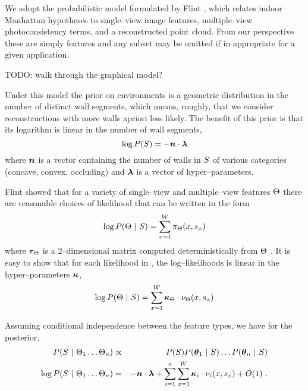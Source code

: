 We adopt the probabilistic model formulated by Flint \etal
\cite{Flint11}, which relates indoor Manhattan hypotheses to
single--view image features, multiple--view photoconsistency terms,
and a reconstructed point cloud. From our perspective these are simply
features and any subset may be omitted if in appropriate for a given
application.

TODO: walk through the graphical model?

Under this model the prior on environments is a geometric distribution
in the number of distinct wall segments, which means, roughly, that we
consider reconstructions with more walls apriori less likely. The
benefit of this prior is that its logarithm is linear in the number of
wall segments,
\begin{equation}
  \log P(S) = - \boldsymbol{n} \cdot \boldsymbol{\lambda}
\end{equation}
where $\boldsymbol{n}$ is a vector containing the number of walls in $S$
of various categories (concave, convex, occluding) and $\boldsymbol{\lambda}$ is
a vector of hyper--parameters.

Flint \etal showed that for a variety of single--view and
multiple--view features $\Theta$ there are reasonable choices of
likelihood that can be written in the form
\begin{equation}
  \log P(\Theta ~|~ S) = \sum_{x=1}^W 
  \pi_{\Theta}(x,s_x)
\end{equation}
where $\pi_{\Theta}$ is a 2--dimensional matrix computed
deterministically from $\Theta$ \cite{Flint11}. It is easy to show
that for each likelihood in \cite{Flint11}, the log--likelihoods
is linear in the hyper--parameters $\boldsymbol{\kappa}$,
\begin{equation}
  \log P(\Theta ~|~ S) = 
  \sum_{x=1}^W
    \boldsymbol{\kappa}_{\Theta} 
    \cdot
    \nu_{\Theta}(x,s_x)
\end{equation}

Assuming conditional independence between the feature types, we have
for the posterior,
\begin{eqnarray}
  P(S ~|~ \Theta_1 \ldots \Theta_n)
  &\propto&
  P(S) P(\boldsymbol{\theta}_1 ~|~ S) \ldots P(\boldsymbol{\theta}_n ~|~ S)\\
  \log P(S ~|~ \Theta_1 \ldots \Theta_n)
  &=&
  - \boldsymbol{n} \cdot \boldsymbol{\lambda}
  + \sum_{i=1}^n \sum_{x=1}^W 
      \boldsymbol{\kappa}_i
      \cdot
      \nu_i(x,s_x)
  + O(1) ~.
  \label{eq:log-posterior}
\end{eqnarray}

